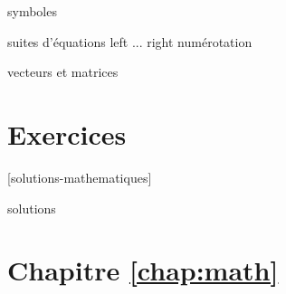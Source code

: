 symboles

suites d'équations
  left ... right
  numérotation

vecteurs et matrices


\section{Exercices}
\label{sec:math:exercices}

[solutions-mathematiques]

\begin{Filesave}{solutions}
\section*{Chapitre \ref*{chap:math}}

\end{Filesave}




